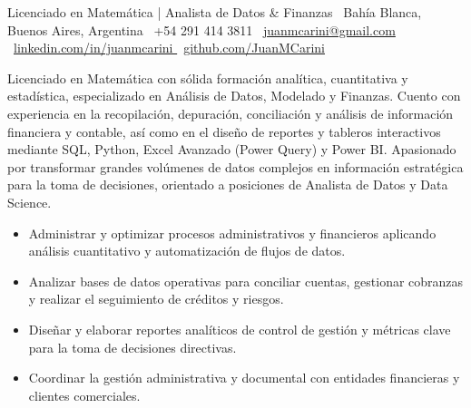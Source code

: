 \documentclass{CV_template}
\begin{document}
{Licenciado en Matemática | Analista de Datos \& Finanzas}
{
    \faMapMarker\ Bahía Blanca, Buenos Aires, Argentina \quad \textbar \quad
    \faPhone\ +54 291 414 3811 \quad \textbar \quad
    \faEnvelope\ \href{mailto:juanmcarini@gmail.com}{juanmcarini@gmail.com} \\[2.5pt]
    \faLinkedinSquare\ \href{https://www.linkedin.com/in/juanmcarini}{linkedin.com/in/juanmcarini {\footnotesize\faExternalLink}} \quad \textbar \quad
    \faGithub\ \href{https://github.com/JuanMCarini}{github.com/JuanMCarini {\footnotesize\faExternalLink}}
}

Licenciado en Matemática con sólida formación analítica, cuantitativa y estadística, especializado en Análisis de Datos, Modelado y Finanzas. Cuento con experiencia en la recopilación, depuración, conciliación y análisis de información financiera y contable, así como en el diseño de reportes y tableros interactivos mediante SQL, Python, Excel Avanzado (Power Query) y Power BI. Apasionado por transformar grandes volúmenes de datos complejos en información estratégica para la toma de decisiones, orientado a posiciones de Analista de Datos y Data Science.


\begin{itemize}
    \item Administrar y optimizar procesos administrativos y financieros aplicando análisis cuantitativo y automatización de flujos de datos.
    \item Analizar bases de datos operativas para conciliar cuentas, gestionar cobranzas y realizar el seguimiento de créditos y riesgos.
    \item Diseñar y elaborar reportes analíticos de control de gestión y métricas clave para la toma de decisiones directivas.
    \item Coordinar la gestión administrativa y documental con entidades financieras y clientes comerciales.
\end{itemize}
\end{document}
